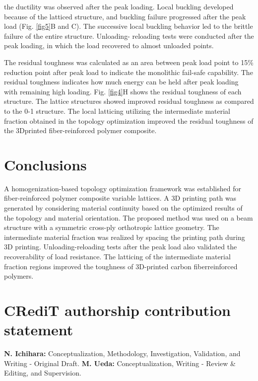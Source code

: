 \documentclass[a4paper,7pt,fleqn]{article}   %
\begin{document}
\begin{multicols}{2}
		the ductility was observed after the peak loading. Local buckling
		developed because of the latticed structure, and buckling failure progressed
		after the peak load (Fig. \ref{fig5}B and C). The successive local buckling
		behavior led to the brittle failure of the entire structure. Unloading-
		reloading tests were conducted after the peak loading, in which the
		load recovered to almost unloaded points.     \par    %
		The residual toughness was calculated as an area between peak load
		point to 15\% reduction point after peak load to indicate the monolithic
		fail-safe capability. The residual toughness indicates how much energy
		can be held after peak loading with remaining high loading. Fig. \ref{fig4}H
		shows the residual toughness of each structure. The lattice structures
		showed improved residual toughness as compared to the 0-1 structure.
		The local latticing utilizing the intermediate material fraction obtained
		in the topology optimization improved the residual toughness of the 3Dprinted
		fiber-reinforced polymer composite.
		
		\section{Conclusions}
		\label{Conclusions}
		A homogenization-based topology optimization framework was
		established for fiber-reinforced polymer composite variable lattices. A
		3D printing path was generated by considering material continuity
		based on the optimized results of the topology and material orientation.
		The proposed method was used on a beam structure with a symmetric
		cross-ply orthotropic lattice geometry. The intermediate material fraction
		was realized by spacing the printing path during 3D printing.
		Unloading-reloading tests after the peak load also validated the recoverability
		of load resistance. The latticing of the intermediate material
		fraction regions improved the toughness of 3D-printed carbon fiberreinforced
		polymers.
		
		\section*{CRediT authorship contribution statement}
		\textbf{N. Ichihara:} Conceptualization, Methodology, Investigation,
		Validation, and Writing - Original Draft. \textbf{M. Ueda:} Conceptualization,
		Writing - Review \& Editing, and Supervision.
		

\end{multicols}
\end{document}
